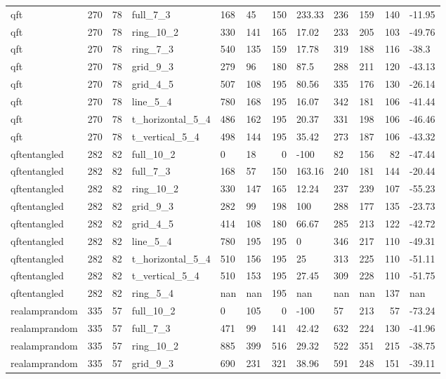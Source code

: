 \begin{longtable}{lrrlllrlllrl}
qft & 270 & 78 & full\_7\_3 & 168 & 45 & 150 & 233.33 & 236 & 159 & 140 & -11.95 \\
qft & 270 & 78 & ring\_10\_2 & 330 & 141 & 165 & 17.02 & 233 & 205 & 103 & -49.76 \\
qft & 270 & 78 & ring\_7\_3 & 540 & 135 & 159 & 17.78 & 319 & 188 & 116 & -38.3 \\
qft & 270 & 78 & grid\_9\_3 & 279 & 96 & 180 & 87.5 & 288 & 211 & 120 & -43.13 \\
qft & 270 & 78 & grid\_4\_5 & 507 & 108 & 195 & 80.56 & 335 & 176 & 130 & -26.14 \\
qft & 270 & 78 & line\_5\_4 & 780 & 168 & 195 & 16.07 & 342 & 181 & 106 & -41.44 \\
qft & 270 & 78 & t\_horizontal\_5\_4 & 486 & 162 & 195 & 20.37 & 331 & 198 & 106 & -46.46 \\
qft & 270 & 78 & t\_vertical\_5\_4 & 498 & 144 & 195 & 35.42 & 273 & 187 & 106 & -43.32 \\
qftentangled & 282 & 82 & full\_10\_2 & 0 & 18 & 0 & -100 & 82 & 156 & 82 & -47.44 \\
qftentangled & 282 & 82 & full\_7\_3 & 168 & 57 & 150 & 163.16 & 240 & 181 & 144 & -20.44 \\
qftentangled & 282 & 82 & ring\_10\_2 & 330 & 147 & 165 & 12.24 & 237 & 239 & 107 & -55.23 \\
qftentangled & 282 & 82 & grid\_9\_3 & 282 & 99 & 198 & 100 & 288 & 177 & 135 & -23.73 \\
qftentangled & 282 & 82 & grid\_4\_5 & 414 & 108 & 180 & 66.67 & 285 & 213 & 122 & -42.72 \\
qftentangled & 282 & 82 & line\_5\_4 & 780 & 195 & 195 & 0 & 346 & 217 & 110 & -49.31 \\
qftentangled & 282 & 82 & t\_horizontal\_5\_4 & 510 & 156 & 195 & 25 & 313 & 225 & 110 & -51.11 \\
qftentangled & 282 & 82 & t\_vertical\_5\_4 & 510 & 153 & 195 & 27.45 & 309 & 228 & 110 & -51.75 \\
qftentangled & 282 & 82 & ring\_5\_4 & nan & nan & 195 & nan & nan & nan & 137 & nan \\
realamprandom & 335 & 57 & full\_10\_2 & 0 & 105 & 0 & -100 & 57 & 213 & 57 & -73.24 \\
realamprandom & 335 & 57 & full\_7\_3 & 471 & 99 & 141 & 42.42 & 632 & 224 & 130 & -41.96 \\
realamprandom & 335 & 57 & ring\_10\_2 & 885 & 399 & 516 & 29.32 & 522 & 351 & 215 & -38.75 \\
realamprandom & 335 & 57 & grid\_9\_3 & 690 & 231 & 321 & 38.96 & 591 & 248 & 151 & -39.11 \\

\end{longtable}
